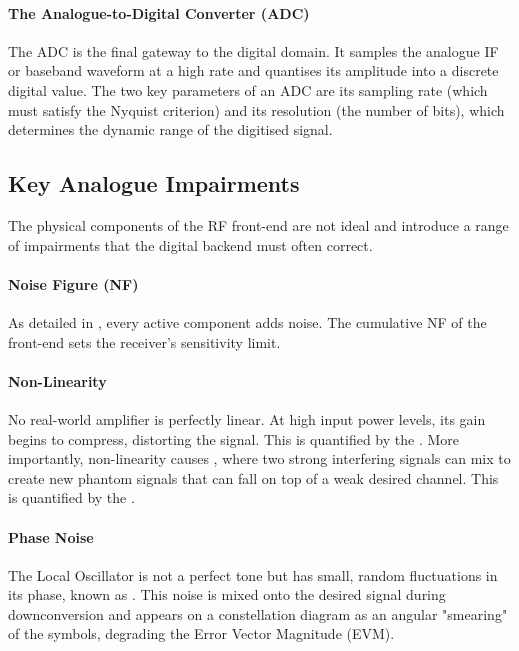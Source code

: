 \paragraph{The Analogue-to-Digital Converter (ADC)}
The ADC is the final gateway to the digital domain. It samples the analogue IF or baseband waveform at a high rate and quantises its amplitude into a discrete digital value. The two key parameters of an ADC are its sampling rate (which must satisfy the Nyquist criterion) and its resolution (the number of bits), which determines the dynamic range of the digitised signal.

\subsection{Key Analogue Impairments}

The physical components of the RF front-end are not ideal and introduce a range of impairments that the digital backend must often correct.

\paragraph{Noise Figure (NF)}
As detailed in , every active component adds noise. The cumulative NF of the front-end sets the receiver's sensitivity limit.

\paragraph{Non-Linearity}
No real-world amplifier is perfectly linear. At high input power levels, its gain begins to compress, distorting the signal. This is quantified by the . More importantly, non-linearity causes , where two strong interfering signals can mix to create new phantom signals that can fall on top of a weak desired channel. This is quantified by the .

\paragraph{Phase Noise}
The Local Oscillator is not a perfect tone but has small, random fluctuations in its phase, known as . This noise is mixed onto the desired signal during downconversion and appears on a constellation diagram as an angular "smearing" of the symbols, degrading the Error Vector Magnitude (EVM).

